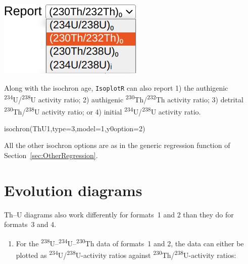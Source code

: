 \begin{refsection}
\noindent\begin{minipage}[t]{.25\linewidth}
\strut\vspace*{-\baselineskip}\newline
\includegraphics[width=\linewidth]{../figures/ThUy0.png}
\end{minipage}
\begin{minipage}[t]{.75\linewidth}
Along with the isochron age, \texttt{IsoplotR} can also report 1) the
authigenic \textsuperscript{234}U/\textsuperscript{238}U activity
ratio; 2) authigenic \textsuperscript{230}Th/\textsuperscript{232}Th
activity ratio; 3) detrital
\textsuperscript{230}Th/\textsuperscript{238}U activity ratio; or 4)
initial \textsuperscript{234}U/\textsuperscript{238}U activity ratio.
\end{minipage}

\begin{script}
isochron(ThU1,type=3,model=1,y0option=2)
\end{script}

All the other isochron options are as in the generic regression
function of Section~\ref{sec:OtherRegression}.

\section{Evolution diagrams}

Th--U diagrams also work differently for formats~1 and 2 than they do
for formats~3 and 4.

\begin{enumerate}

\item For the
  \textsuperscript{238}U--\textsuperscript{234}U--\textsuperscript{230}Th
  data of formats~1 and 2, the data can either be plotted as
  \textsuperscript{234}U/\textsuperscript{238}U-activity ratios
  against \textsuperscript{230}Th/\textsuperscript{238}U-activity
  ratios:


\end{enumerate}
\end{refsection}
